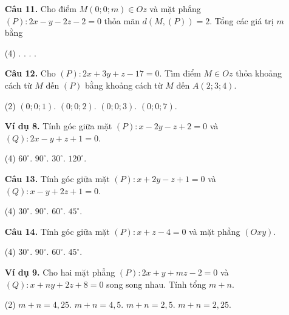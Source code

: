 \documentclass[12pt, a4paper]{article}
\begin{document}
\begin{enumerate}[label=\textbf{\arabic*.}, wide=0pt, leftmargin=*]
    \item[\textbf{Câu 11.}] Cho điểm \(M(0;0;m) \in Oz\) và mặt phẳng \((P) : 2x - y - 2z - 2 = 0\) thỏa mãn \(d(M, (P)) = 2\). Tổng các giá trị \(m\) bằng
    \begin{tasks}(4)
        .
        .
        .
        .
    \end{tasks}
    
    \item[\textbf{Câu 12.}] Cho \((P) : 2x + 3y + z - 17 = 0\). Tìm điểm \(M \in Oz\) thỏa khoảng cách từ \(M\) đến \((P)\) bằng khoảng cách từ \(M\) đến \(A(2;3;4)\).
    \begin{tasks}(2)
        \task \((0;0;1)\).
        \task \((0;0;2)\).
        \task \((0;0;3)\).
        \task \((0;0;7)\).
    \end{tasks}
    
    \item[\textbf{Ví dụ 8.}] Tính góc giữa mặt \((P) : x - 2y - z + 2 = 0\) và \((Q) : 2x - y + z + 1 = 0\).
    \begin{tasks}(4)
        \task \(60^\circ\).
        \task \(90^\circ\).
        \task \(30^\circ\).
        \task \(120^\circ\).
    \end{tasks}
    
    
    \item[\textbf{Câu 13.}] Tính góc giữa mặt \((P) : x + 2y - z + 1 = 0\) và \((Q) : x - y + 2z + 1 = 0\).
    \begin{tasks}(4)
        \task \(30^\circ\).
        \task \(90^\circ\).
        \task \(60^\circ\).
        \task \(45^\circ\).
    \end{tasks}
    
    \item[\textbf{Câu 14.}] Tính góc giữa mặt \((P) : x + z - 4 = 0\) và mặt phẳng \((Oxy)\).
    \begin{tasks}(4)
        \task \(30^\circ\).
        \task \(90^\circ\).
        \task \(60^\circ\).
        \task \(45^\circ\).
    \end{tasks}
    
    \item[\textbf{Ví dụ 9.}] Cho hai mặt phẳng \((P) : 2x + y + mz - 2 = 0\) và \((Q) : x + ny + 2z + 8 = 0\) song song nhau. Tính tổng \(m+n\).
    \begin{tasks}(2)
        \task \(m+n = 4,25\).
        \task \(m+n = 4,5\).
        \task \(m+n = 2,5\).
        \task \(m+n = 2,25\).
    \end{tasks}
    

\end{enumerate}
\end{document}
